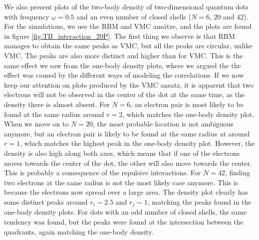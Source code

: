 We also present plots of the two-body density of two-dimensional quantum dots with frequency $\omega=0.5$ and an even number of closed shells ($N=6$, 20 and 42). For the simulations, we use the RBM and VMC ansätze, and the plots are found in figure \eqref{fig:TB_interaction_20P}. The first thing we observe is that RBM manages to obtain the same peaks as VMC, but all the peaks are circular, unlike VMC. The peaks are also more distinct and higher than for VMC. This is the same effect we saw from the one-body density plots, where we argued the the effect was caused by the different ways of modeling the correlations. If we now keep our attention on plots produced by the VMC ansatz, it is apparent that two electrons will not be observed in the center of the dot at the same time, as the density there is almost absent. For $N=6$, an electron pair is most likely to be found at the same radius around $r=2$, which matches the one-body density plot. When we move on to $N=20$, the most probable location is not ambiguous anymore, but an electron pair is likely to be found at the same radius at around $r=1$, which matches the highest peak in the one-body density plot. However, the density is also high along both axes, which means that if one of the electrons moves towards the center of the dot, the other will also move towards the center. This is probably a consequence of the repulsive interactions. For $N=42$, finding two electrons at the same radius is not the most likely case anymore. This is because the electrons now spread over a large area. The density plot clearly has some distinct peaks around $r_i\sim 2.5$ and $r_j\sim 1$, matching the peaks found in the one-body density plots. For dots with an odd number of closed shells, the same tendency was found, but the peaks were found at the intersection between the quadrants, again matching the one-body density.

